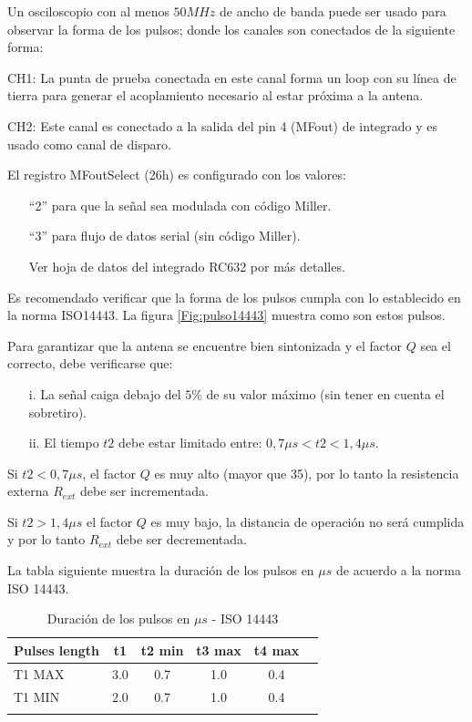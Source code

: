 \bigskip
Un osciloscopio con al menos $50 MHz$ de ancho de banda puede ser usado para observar la forma de los pulsos; donde los canales son conectados de la siguiente forma:

\bigskip
CH1:   La punta de prueba conectada en este canal forma un loop con su línea de tierra para generar el acoplamiento necesario al estar próxima a la antena.

\bigskip
CH2:   Este canal es conectado a la salida del pin 4 (MFout) de integrado y es usado como canal de disparo.
\bigskip

El registro MFoutSelect (26h) es configurado con los valores:
\begin{itemize}	
\item[]	“2” para que la señal sea modulada con código Miller.
\item[]	“3” para flujo de datos serial (sin código Miller).
\item[]	Ver hoja de datos del integrado RC632 por más detalles.	
\end{itemize}	

Es recomendado verificar que la forma de los pulsos cumpla con lo establecido en la norma ISO14443. La figura \ref{Fig:pulso14443} muestra como son estos pulsos.


Para garantizar que la antena se encuentre bien sintonizada y el factor $Q$ sea el correcto, debe verificarse que:


\begin{itemize}
\item[i.] La señal caiga debajo del $5\%$ de su valor máximo (sin tener en cuenta el sobretiro).
\item[ii.] El tiempo $t2$ debe estar limitado entre:  $0,7\mu s < t2 < 1,4\mu s$.
\end{itemize}

Si $t2 < 0,7\mu s$, el factor $Q$ es muy alto (mayor que 35), por lo tanto la resistencia externa $R_{ext}$ debe ser incrementada.

\bigskip
Si  $t2 > 1,4\mu s$ el factor $Q$ es muy bajo, la distancia de operación no será cumplida y por lo tanto $R_{ext}$ debe ser decrementada.

\bigskip
La tabla siguiente muestra la duración de los pulsos en $\mu s$ de acuerdo a la norma ISO 14443.

\begin{longtable}{|l|c|c|c|c|r|}
\hline
\multicolumn{1}{|c|}{\textbf{Pulses length}} & \textbf{t1} & \textbf{t2 min} & \textbf{t3 max} & \textbf{t4 max} \\ \hline

T1 MAX 			 &          3.0    &       0.7    &            1.0 &                0.4 \\ \hline
T1 MIN 			 &          2.0    &       0.7    &            1.0 &                0.4 \\ \hline
\caption{Duración de los pulsos en $\mu s$ - ISO 14443}
\label{}
\end{longtable}

